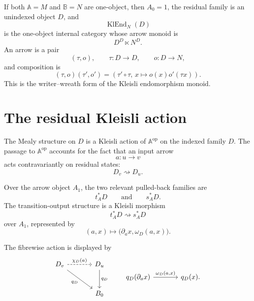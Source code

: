 If both \(\mathbb A=M\) and \(\mathbb B=N\) are one-object, then
\(A_0=1\), the residual family is an unindexed object \(D\), and
\[
    \operatorname{KlEnd}_{N}(D)
\]
is the one-object internal category whose arrow monoid is
\[
    D^D\ltimes N^D.
\]
An arrow is a pair
\[
    (\tau,o),
    \qquad
    \tau:D\to D,
    \qquad
    o:D\to N,
\]
and composition is
\[
    (\tau,o)(\tau',o')
    =
    \left(
        \tau'\circ\tau,\,
        x\longmapsto o(x)o'(\tau x)
    \right).
\]
This is the writer--wreath form of the Kleisli endomorphism monoid.

\section{The residual Kleisli action}
\label{sec:syn-to-residual-kleisli-action}

The Mealy structure on \(D\) is a Kleisli action of
\(\mathbb A^{\mathrm{op}}\) on the indexed family \(D\). The passage to
\(\mathbb A^{\mathrm{op}}\) accounts for the fact that an input arrow
\[
    a:u\to v
\]
acts contravariantly on residual states:
\[
    D_v\rightsquigarrow D_u.
\]

Over the arrow object \(A_1\), the two relevant pulled-back families are
\[
    t_A^*D
    \qquad\text{and}\qquad
    s_A^*D.
\]
The transition-output structure is a Kleisli morphism
\[
    t_A^*D\rightsquigarrow s_A^*D
\]
over \(A_1\), represented by
\[
    (a,x)
    \longmapsto
    \bigl(\partial_a x,\omega_D(a,x)\bigr).
\]

The fibrewise action is displayed by
\[
\begin{tikzcd}[column sep=large, row sep=large]
    D_v
        \arrow[r, dashed, "{\chi_D(a)}"]
        \arrow[dr, "q_D"']
    &
    D_u
        \arrow[d, "q_D"]
    \\
    &
    B_0
\end{tikzcd}
\qquad
\begin{tikzcd}[column sep=large, row sep=large]
    q_D(\partial_a x)
        \arrow[r, "{\omega_D(a,x)}"]
    &
    q_D(x).
\end{tikzcd}
\]

